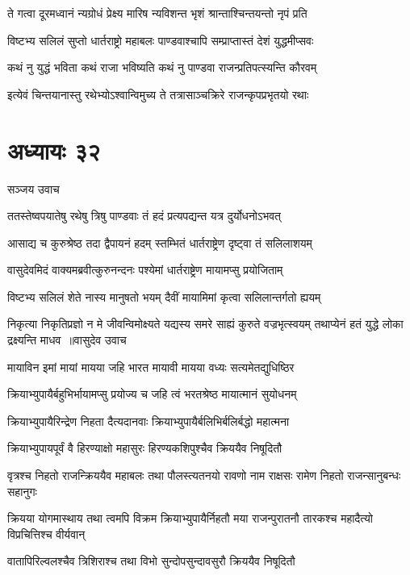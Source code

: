 \twolineshloka
{ते गत्वा दूरमध्वानं न्यग्रोधं प्रेक्ष्य मारिष}
{न्यविशन्त भृशं श्रान्ताश्चिन्तयन्तो नृपं प्रति}


\twolineshloka
{विष्टभ्य सलिलं सुप्तो धार्तराष्ट्रो महाबलः}
{पाण्डवाश्चापि सम्प्राप्तास्तं देशं युद्धमीप्सवः}


\twolineshloka
{कथं नु युद्धं भविता कथं राजा भविष्यति}
{कथं नु पाण्डवा राजन्प्रतिपत्स्यन्ति कौरवम्}


\twolineshloka
{इत्येवं चिन्तयानास्तु रथेभ्योऽश्वान्विमुच्य ते}
{तत्रासाञ्चक्रिरे राजन्कृपप्रभृतयो रथाः}


\chapter{अध्यायः ३२}
\twolineshloka
{सञ्जय उवाच}
{}


\twolineshloka
{ततस्तेष्वपयातेषु रथेषु त्रिषु पाण्डवाः}
{तं हदं प्रत्यपद्यन्त यत्र दुर्योधनोऽभवत्}


\twolineshloka
{आसाद्य च कुरुश्रेष्ठ तदा द्वैपायनं हदम्}
{स्तम्भितं धार्तराष्ट्रेण दृष्ट्वा तं सलिलाशयम्}


\twolineshloka
{वासुदेवमिदं वाक्यमब्रवीत्कुरुनन्दनः}
{पश्येमां धार्तराष्ट्रेण मायामप्सु प्रयोजिताम्}


\twolineshloka
{विष्टभ्य सलिलं शेते नास्य मानुषतो भयम्}
{दैवीं मायामिमां कृत्वा सलिलान्तर्गतो ह्ययम्}


\fourlineindentedshloka
{निकृत्या निकृतिप्रज्ञो न मे जीवन्विमोक्ष्यते}
{यद्यस्य समरे साह्यं कुरुते वज्रभृत्स्वयम्}
{तथाप्येनं हतं युद्धे लोका द्रक्ष्यन्ति माधव ॥वासुदेव उवाच}
{}


\twolineshloka
{मायाविन इमां मायां मायया जहि भारत}
{मायावी मायया वध्यः सत्यमेतद्युधिष्ठिर}


\twolineshloka
{क्रियाभ्युपायैर्बहुभिर्भायामप्सु प्रयोज्य च}
{जहि त्वं भरतश्रेष्ठ मायात्मानं सुयोधनम्}


\twolineshloka
{क्रियाभ्युपायैरिन्द्रेण निहता दैत्यदानवाः}
{क्रियाभ्युपायैर्बलिभिर्बलिर्बद्धो महात्मना}


\twolineshloka
{क्रियाभ्युपायपूर्वं वै हिरण्याक्षो महासुरः}
{हिरण्यकशिपुश्चैव क्रिययैव निषूदितौ}


\threelineshloka
{वृत्रश्च निहतो राजन्क्रिययैव महाबलः}
{तथा पौलस्त्यतनयो रावणो नाम राक्षसः}
{रामेण निहतो राजन्सानुबन्धः सहानुगः}


क्रियया योगमास्थाय तथा त्वमपि विक्रम
\twolineshloka
{क्रियाभ्युपायैर्निहतौ मया राजन्पुरातनौ}
{तारकश्च महादैत्यो विप्रचित्तिश्च वीर्यवान्}


\twolineshloka
{वातापिरिल्वलश्चैव त्रिशिराश्च तथा विभो}
{सुन्दोपसुन्दावसुरौ क्रिययैव निषूदितौ}


